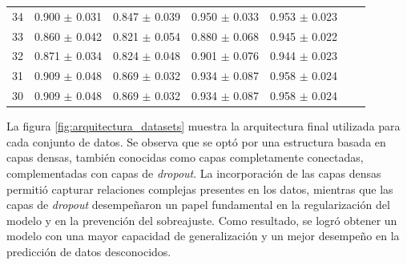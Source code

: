 \begin{table}[H]
\begin{tabular}{l c c c c c c}
      34 & 0.900 $\pm$ 0.031 & 0.847 $\pm$ 0.039	& 0.950 $\pm$ 0.033 & 0.953  $\pm$ 0.023\\
      33 & 0.860 $\pm$ 0.042 & 0.821 $\pm$ 0.054	& 0.880 $\pm$ 0.068 & 0.945  $\pm$ 0.022\\
      32 & 0.871 $\pm$ 0.034 & 0.824 $\pm$ 0.048	& 0.901 $\pm$ 0.076 & 0.944  $\pm$ 0.023\\
      31 & 0.909 $\pm$ 0.048 & 0.869 $\pm$ 0.032	& 0.934 $\pm$ 0.087 & 0.958  $\pm$ 0.024\\
      30 & 0.909 $\pm$ 0.048 & 0.869 $\pm$ 0.032	& 0.934 $\pm$ 0.087 & 0.958  $\pm$ 0.024\\

		\bottomrule
		\hline
	\end{tabular}
	\label{tab:tablamodelos_1layers}
\end{table}


La figura \ref{fig:arquitectura_datasets} muestra la arquitectura final utilizada para cada conjunto de datos. 
Se observa que se optó por una estructura basada en capas densas, también conocidas como capas 
completamente conectadas, complementadas con capas de \emph{dropout}. La incorporación de las capas 
densas permitió capturar relaciones complejas presentes en los datos, mientras que las capas de 
\emph{dropout} desempeñaron un papel fundamental en la regularización del modelo y en la prevención 
del sobreajuste. Como resultado, se logró obtener un modelo con una mayor capacidad de generalización 
y un mejor desempeño en la predicción de datos desconocidos.



